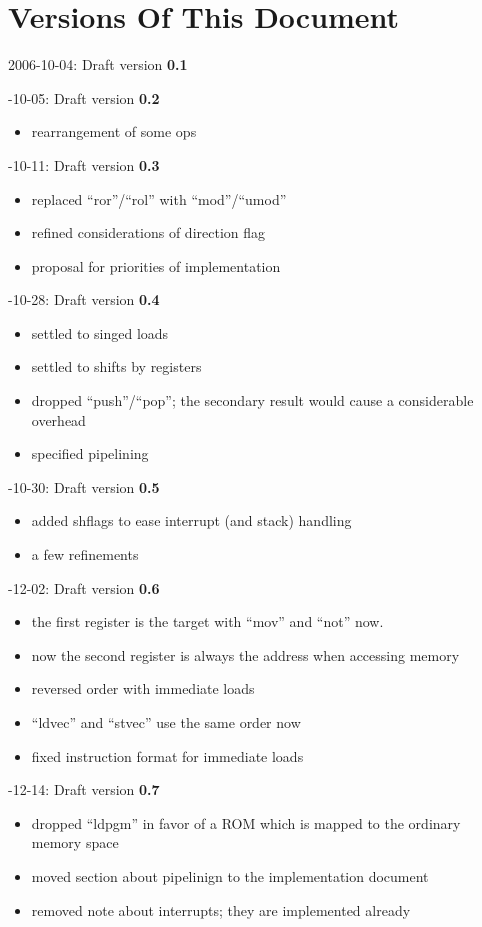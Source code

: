 \documentclass[10pt, twoside, a4paper]{article}
\begin{document}
  \section{Versions Of This Document}
  
  2006-10-04: Draft version \textbf{0.1}

  -10-05: Draft version \textbf{0.2}
  \begin{itemize}
    \item rearrangement of some ops
  \end{itemize}

  -10-11: Draft version \textbf{0.3}
  \begin{itemize}
    \item replaced ``ror''/``rol'' with ``mod''/``umod''
    \item refined considerations of direction flag
    \item proposal for priorities of implementation
  \end{itemize}

  -10-28: Draft version \textbf{0.4}
  \begin{itemize}
    \item settled to singed loads
    \item settled to shifts by registers
    \item dropped ``push''/``pop''; the secondary result would cause a
      considerable overhead
    \item specified pipelining
  \end{itemize}

  -10-30: Draft version \textbf{0.5}
  \begin{itemize}
    \item added shflags to ease interrupt (and stack) handling
    \item a few refinements
  \end{itemize}

  -12-02: Draft version \textbf{0.6}
  \begin{itemize}
    \item the first register is the target with ``mov'' and ``not'' now.
    \item now the second register is always the address when accessing memory
    \item reversed order with immediate loads
    \item ``ldvec'' and ``stvec'' use the same order now
    \item fixed instruction format for immediate loads
  \end{itemize}

  -12-14: Draft version \textbf{0.7}
  \begin{itemize}
  \item dropped ``ldpgm'' in favor of a ROM which is mapped to the
    ordinary memory space
  \item moved section about pipelinign to the implementation document
  \item removed note about interrupts; they are implemented already
  \end{itemize}
\end{document}
